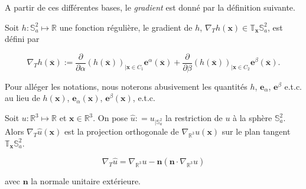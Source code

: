 A partir de ces différentes bases, le \textit{gradient} est donné par la définition suivante.

\begin{definition}
Soit $h : \mathbb{S}_a^2 \mapsto \mathbb{R}$ une fonction régulière, le gradient de $h$, $\nabla_T h(\mathbf{x}) \in \mathbb{T}_{\mathbf{x}}\mathbb{S}^2_a$, est défini par

\begin{equation}
\nabla_{T} h(\overline{\mathbf{x}}) := \dfrac{\partial}{\partial \alpha} \left( h(\overline{\mathbf{x}}) \right)_{| \mathbf{x} \in C_1} \mathbf{e}^{\alpha}(\overline{\mathbf{x}}) + \dfrac{\partial}{\partial \beta}\left(  h(\overline{\mathbf{x}}) \right)_{| \mathbf{x} \in C_2} \mathbf{e}^{\beta}(\overline{\mathbf{x}}).
\label{eq: gradient}
\end{equation}
\end{definition}
Pour alléger les notations, nous noterons abusivement les quantités $h$, $\mathbf{e}_{\alpha}$, $\mathbf{e}^{\beta}$ e.t.c. au lieu de $h(\mathbf{x})$, $\mathbf{e}_{\alpha}(\mathbf{x})$, $\mathbf{e}^{\beta}(\mathbf{x})$, e.t.c.


\begin{proposition}
Soit $u: \mathbb{R}^3 \mapsto \mathbb{R}$ et $\mathbf{x} \in \mathbb{R}^3$. On pose $\hat{u} : = u_{|\mathbb{S}_a^2}$ la restriction de $u$ à la sphère $\mathbb{S}_a^2$. Alors $\nabla_{T} \hat{u} (\mathbf{x})$ est la projection orthogonale de $\nabla_{\mathbb{R}^3} u (\mathbf{x})$ sur le plan tangent $\mathbb{T}_{\mathbf{x}} \mathbb{S}_a^2$.

\begin{equation}
\nabla_T \hat{u} = \nabla_{\mathbb{R}^3} u - \mathbf{n} \left( \mathbf{n} \cdot \nabla_{\mathbb{R}^3} u \right)
\end{equation}

avec $\mathbf{n}$ la normale unitaire extérieure.
\label{prop:gradient_project}
\end{proposition}

